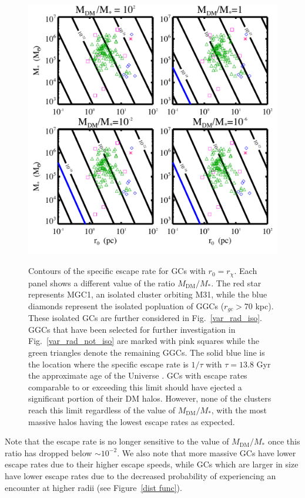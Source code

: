 \documentclass[aps,floatfix,prd,showpacs]{revtex4}
\newcommand{\rx}{r_\chi}
\newcommand{\MDM}{M_{\mathrm{DM}}}
\begin{document}
\begin{figure}[htp]
\centering
\includegraphics[width=12cm, height=12cm]{EscapePlummer}
\caption{Contours of the specific escape rate for GCs with $r_0 = \rx$. Each panel shows a different value of the ratio $\MDM/M_*$. The red star represents MGC1, an isolated cluster orbiting M31, while the blue diamonds represent the isolated popluation of GGCs ($r_{gc} > 70$ kpc). These isolated GCs are further considered in Fig.~\ref{var_rad_iso}. GGCs that have been selected for further investigation in Fig.~\ref{var_rad_not_iso} are marked with pink squares while the green triangles denote the remaining GGCs. The solid blue line is the location where the specific escape rate is $1/\tau$ with $\tau = 13.8$ Gyr the approximate age of the Universe \cite{Planck15}. GCs with escape rates comparable to or exceeding this limit should have ejected a significant portion of their DM halos. However, none of the clusters reach this limit regardless of the value of $\MDM/M_*$, with the most massive halos having the lowest escape rates as expected.}
\label{EscapePlummer1}
\end{figure}
%
%
Note that the escape rate is no longer sensitive to the value of $\MDM/M_*$ once this ratio has dropped below $\sim 10^{-2}$. We also note that more massive GCs have lower escape rates due to their higher escape speeds, while GCs which are larger in size have lower escape rates due to the decreased probability of experiencing an encounter at higher radii (see Figure~\ref{dist func}).
\end{document}
